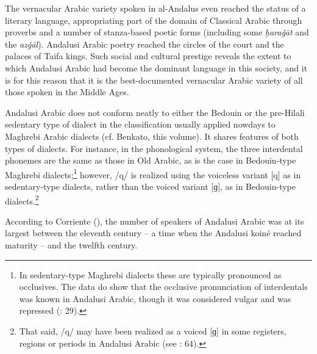 \documentclass[output=paper,modfonts,nonflat]{langsci/langscibook}
\begin{document}
The vernacular Arabic variety spoken in al-Andalus even reached the status of a literary language, appropriating part of the domain of Classical Arabic through proverbs and a number of stanza-based poetic forms (including some \textit{ḫaraǧāt} and the \textit{azǧāl}). Andalusi Arabic poetry reached the circles of the court and the palaces of Taifa kings. Such social and cultural prestige reveals the extent to which Andalusi Arabic had become the dominant language in this society, and it is for this reason that it is the best-documented vernacular Arabic variety of all those spoken in the Middle Ages. 

Andalusi Arabic does not conform neatly to either the Bedouin or the pre-Hilali sedentary type of dialect in the classification usually applied nowdays to Maghrebi Arabic dialects (cf. Benkato, this volume). It shares features of both types of dialects. For instance, in the phonological system, the three interdental phonemes are the same as those in Old Arabic, as is the case in Bedouin-type Maghrebi dialects;\footnote{In sedentary-type Maghrebi dialects these are typically pronounced as occlusives. The data do show that the occlusive pronunciation of interdentals was known in Andalusi Arabic, though it was considered vulgar and was repressed (\citealt{CorrientePereiraVicente2015}: 29).}  however, /q/ is realized using the voiceless variant [q] as in sedentary-type dialects, rather than the voiced variant [ɡ], as in Bedouin-type dialects.\footnote{That said, /q/ may have been realized as a voiced [ɡ] in some registers, regions or periods in Andalusi Arabic (see \citealt{CorrientePereiraVicente2015}: 64).}

According to Corriente (\citeyear[34]{Corriente1992book}), the number of speakers of Andalusi Arabic was at its largest between the eleventh century – a time when the Andalusi koiné reached maturity – and the twelfth century. 
\end{document}
